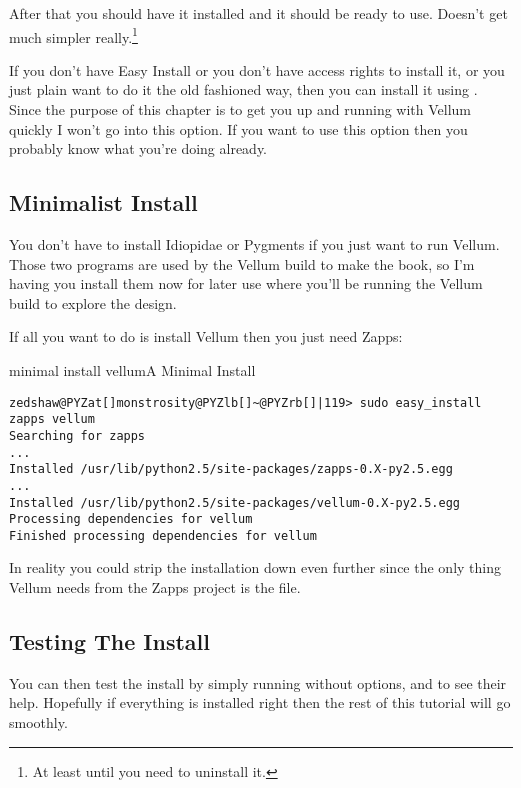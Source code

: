 After that you should have it installed and it should be ready to use.  Doesn't
get much simpler really.\footnote{At least until you need to uninstall it.}

If you don't have Easy Install or you don't have access rights to install it, or
you just plain want to do it the old fashioned way, then you can install it
using .  Since the purpose of this chapter is to get you up and
running with Vellum quickly I won't go into this option.  If you want to use
this option then you probably know what you're doing already.



\subsection{Minimalist Install}

You don't have to install Idiopidae or Pygments if you just want to run Vellum.
Those two programs are used by the Vellum build to make the book, so I'm having
you install them now for later use where you'll be running the Vellum build to
explore the design.

If all you want to do is install Vellum then you just need Zapps:

\begin{code}{minimal install vellum}{A Minimal Install}
\begin{Verbatim}[commandchars=@\[\]]
zedshaw@PYZat[]monstrosity@PYZlb[]~@PYZrb[]|119> sudo easy_install zapps vellum
Searching for zapps
...
Installed /usr/lib/python2.5/site-packages/zapps-0.X-py2.5.egg
...
Installed /usr/lib/python2.5/site-packages/vellum-0.X-py2.5.egg
Processing dependencies for vellum
Finished processing dependencies for vellum
\end{Verbatim}

\end{code}

In reality you could strip the installation down even further since the only
thing Vellum needs from the Zapps project is the  file.



\subsection{Testing The Install}

You can then test the install by simply running  without options,
and  to see their help.  Hopefully if everything is installed
right then the rest of this tutorial will go smoothly.



